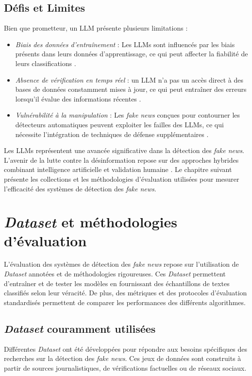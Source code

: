 \documentclass[a4paper,12pt, twocolumn]{article}
\begin{document}
\begin{twocolumn}
\subsection{Défis et Limites}
Bien que prometteur, un LLM présente plusieurs limitations :

\begin{itemize}
\item \textit{Biais des données d'entraînement} : Les LLMs sont influencés par les biais présents dans leurs données d’apprentissage, ce qui peut affecter la fiabilité de leurs classifications \cite{hu_bad_2024}.
\item \textit{Absence de vérification en temps réel} : un LLM n'a pas un accès direct à des bases de données constamment mises à jour, ce qui peut entraîner des erreurs lorsqu'il évalue des informations récentes \cite{truica_its_2023}.
\item \textit{Vulnérabilité à la manipulation} : Les \textit{fake news} conçues pour contourner les détecteurs automatiques peuvent exploiter les failles des LLMs, ce qui nécessite l’intégration de techniques de défense supplémentaires \cite{rai_fake_2022}.
\end{itemize}

\bigskip 
Les LLMs représentent une avancée significative dans la détection des \textit{fake news}. L’avenir de la lutte contre la désinformation repose sur des approches hybrides combinant intelligence artificielle et validation humaine \cite{hu_bad_2024}. Le chapitre suivant présente les collections et les méthodologies d’évaluation utilisées pour mesurer l’efficacité des systèmes de détection des \textit{fake news}.

\section{\textit{Dataset} et méthodologies d’évaluation} \label{chap:dataset}

L’évaluation des systèmes de détection des \textit{fake news} repose sur l’utilisation de \textit{Dataset} annotées et de méthodologies rigoureuses. Ces \textit{Dataset} permettent d’entraîner et de tester les modèles en fournissant des échantillons de textes classifiés selon leur véracité. De plus, des métriques et des protocoles d’évaluation standardisés permettent de comparer les performances des différents algorithmes.

\subsection{\textit{Dataset} couramment utilisées} Différentes \textit{Dataset} ont été développées pour répondre aux besoins spécifiques des recherches sur la détection des \textit{fake news}. Ces jeux de données sont construits à partir de sources journalistiques, de vérifications factuelles ou de réseaux sociaux.


\end{twocolumn}
\end{document}
